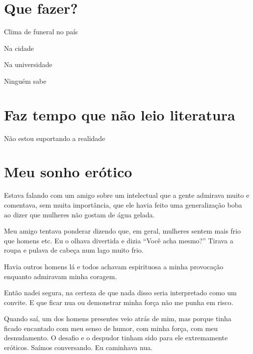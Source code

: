 {\parindent0pt\parskip1pt\raggedright

\chapter{Que fazer?}\label{que-fazer}

Clima de funeral no país

Na cidade

Na universidade

Ninguém sabe}

\chapter{Faz tempo que não leio literatura}

Não estou suportando a realidade

\chapter{Meu sonho erótico}\label{meu-sonho-eruxf3tico}

Estava falando com um amigo sobre um intelectual que a gente admirava
muito e comentava, sem muita importância, que ele havia feito uma
generalização boba ao dizer que mulheres não gostam de água gelada.

Meu amigo tentava ponderar dizendo que, em geral, mulheres sentem mais
frio que homens etc. Eu o olhava divertida e dizia ``Você acha mesmo?''
Tirava a roupa e pulava de cabeça num lago muito frio.

Havia outros homens lá e todos achavam espirituosa a minha provocação
enquanto admiravam minha coragem.

Então nadei segura, na certeza de que nada disso seria interpretado como
um convite. E que ficar nua ou demonstrar minha força não me punha em
risco.

Quando saí, um dos homens presentes veio atrás de mim, mas porque tinha
ficado encantado com meu senso de humor, com minha força, com meu
desnudamento. O desafio e o despudor tinham sido para ele extremamente
eróticos. Saímos conversando. Eu caminhava nua.
